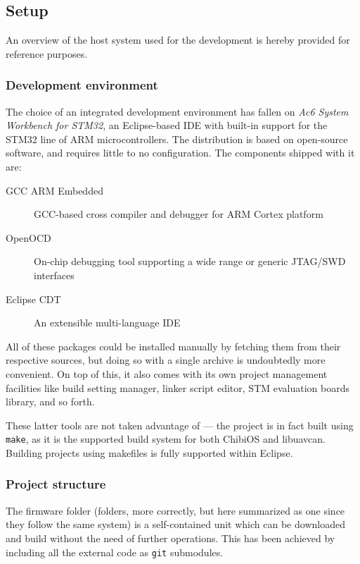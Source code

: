 \subsection{Setup}\label{subsec:sw_setup}
An overview of the host system used for the development is hereby provided for reference purposes.

\subsubsection{Development environment}
The choice of an integrated development environment has fallen on \emph{Ac6 System Workbench for STM32}, an Eclipse-based IDE with built-in support for the STM32 line of ARM microcontrollers.
The distribution is based on open-source software, and requires little to no configuration.
The components shipped with it are:
\begin{description}
    \item[GCC ARM Embedded] GCC-based cross compiler and debugger for ARM Cortex platform
    \item[OpenOCD] On-chip debugging tool supporting a wide range or generic JTAG/SWD interfaces
    \item[Eclipse CDT] An extensible multi-language IDE
\end{description}
All of these packages could be installed manually by fetching them from their respective sources, but doing so with a single archive is undoubtedly more convenient.
On top of this, it also comes with its own project management facilities like build setting manager, linker script editor, STM evaluation boards library, and so forth.

These latter tools are not taken advantage of --- the project is in fact built using \texttt{make}, as it is the supported build system for both ChibiOS and libuavcan.
Building projects using makefiles is fully supported within Eclipse.




\subsubsection{Project structure}
The firmware folder (folders, more correctly, but here summarized as one since they follow the same system) is a self-contained unit which can be downloaded and build without the need of further operations.
This has been achieved by including all the external code as \texttt{git} submodules.


